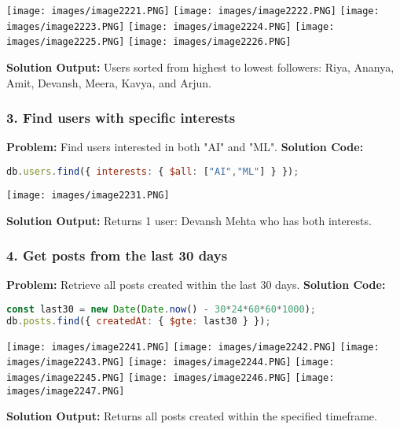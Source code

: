 \documentclass[12pt,a4paper]{article}
\begin{document}
\begin{center}
\texttt{[image: images/image2221.PNG]}
\texttt{[image: images/image2222.PNG]}
\texttt{[image: images/image2223.PNG]}
\texttt{[image: images/image2224.PNG]}
\texttt{[image: images/image2225.PNG]}
\texttt{[image: images/image2226.PNG]}
\end{center}
\textbf{Solution Output:} Users sorted from highest to lowest followers: Riya, Ananya, Amit, Devansh, Meera, Kavya, and Arjun.

\subsubsection{3. Find users with specific interests}
\textbf{Problem:} Find users interested in both "AI" and "ML".
\textbf{Solution Code:}
\begin{lstlisting}[language=JavaScript]
db.users.find({ interests: { $all: ["AI","ML"] } });
\end{lstlisting}

\begin{center}
\texttt{[image: images/image2231.PNG]}
\end{center}

\textbf{Solution Output:} Returns 1 user: Devansh Mehta who has both interests.

\subsubsection{4. Get posts from the last 30 days}
\textbf{Problem:} Retrieve all posts created within the last 30 days.
\textbf{Solution Code:}
\begin{lstlisting}[language=JavaScript]
const last30 = new Date(Date.now() - 30*24*60*60*1000);
db.posts.find({ createdAt: { $gte: last30 } });
\end{lstlisting}

\begin{center}
\texttt{[image: images/image2241.PNG]}
\texttt{[image: images/image2242.PNG]}
\texttt{[image: images/image2243.PNG]}
\texttt{[image: images/image2244.PNG]}
\texttt{[image: images/image2245.PNG]}
\texttt{[image: images/image2246.PNG]}
\texttt{[image: images/image2247.PNG]}
\end{center}
\textbf{Solution Output:} Returns all posts created within the specified timeframe.
\end{document}
